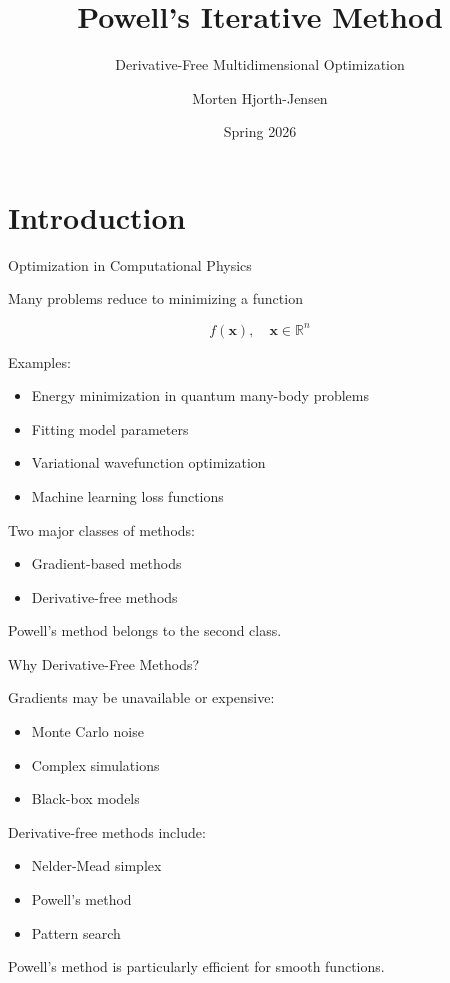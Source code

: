 \documentclass{beamer}
\title{Powell's Iterative Method}
\subtitle{Derivative-Free Multidimensional Optimization}
\author{Morten Hjorth-Jensen}
\date{Spring 2026}
\begin{document}
\frame{\titlepage}

\section{Introduction}

\begin{frame}{Optimization in Computational Physics}

Many problems reduce to minimizing a function

\[
f(\mathbf{x}), \quad \mathbf{x} \in \mathbb{R}^n
\]

Examples:

\begin{itemize}
\item Energy minimization in quantum many-body problems
\item Fitting model parameters
\item Variational wavefunction optimization
\item Machine learning loss functions
\end{itemize}

Two major classes of methods:

\begin{itemize}
\item Gradient-based methods
\item Derivative-free methods
\end{itemize}

Powell's method belongs to the second class.
\end{frame}

\begin{frame}{Why Derivative-Free Methods?}

Gradients may be unavailable or expensive:

\begin{itemize}
\item Monte Carlo noise
\item Complex simulations
\item Black-box models
\end{itemize}

Derivative-free methods include:

\begin{itemize}
\item Nelder-Mead simplex
\item Powell's method
\item Pattern search
\end{itemize}

Powell's method is particularly efficient for smooth functions.
\end{frame}
\end{document}
